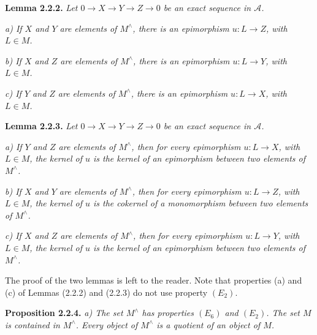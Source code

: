 \clearpage
{}%
\begingroup\small\setlength{\parskip}{0pt}\setlength{\emergencystretch}{1.5em}
\setlength{\abovedisplayskip}{4pt plus 2pt minus 2pt}%
\setlength{\belowdisplayskip}{4pt plus 2pt minus 2pt}%

\noindent\textbf{Lemma 2.2.2.}\quad
\textit{Let
$0\longrightarrow X\longrightarrow Y\longrightarrow Z\longrightarrow0$
be an exact sequence in $\mathcal A$.}

\noindent\textit{a) If $X$ and $Y$ are elements of $M^{\wedge}$, there is
an epimorphism $u\colon L\longrightarrow Z$, with $L\in M$.}

\noindent\textit{b) If $X$ and $Z$ are elements of $M^{\wedge}$, there is
an epimorphism $u\colon L\longrightarrow Y$, with $L\in M$.}

\noindent\textit{c) If $Y$ and $Z$ are elements of $M^{\wedge}$, there is
an epimorphism $u\colon L\longrightarrow X$, with $L\in M$.}

\medskip\noindent\textbf{Lemma 2.2.3.}\quad
\textit{Let
$0\longrightarrow X\longrightarrow Y\longrightarrow Z\longrightarrow0$
be an exact sequence in $\mathcal A$.}

\noindent\textit{a) If $Y$ and $Z$ are elements of $M^{\wedge}$, then for
every epimorphism $u\colon L\longrightarrow X$, with $L\in M$, the kernel
of $u$ is the kernel of an epimorphism between two elements of
$M^{\wedge}$.}

\noindent\textit{b) If $X$ and $Y$ are elements of $M^{\wedge}$, then for
every epimorphism $u\colon L\longrightarrow Z$, with $L\in M$, the kernel
of $u$ is the cokernel of a monomorphism between two elements of
$M^{\wedge}$.}

\noindent\textit{c) If $X$ and $Z$ are elements of $M^{\wedge}$, then for
every epimorphism $u\colon L\longrightarrow Y$, with $L\in M$, the kernel
of $u$ is the kernel of an epimorphism between two elements of
$M^{\wedge}$.}

The proof of the two lemmas is left to the reader. Note that properties
(a) and (c) of Lemmas (2.2.2) and (2.2.3) do not use property $(E_2)$.

\medskip\noindent\textbf{Proposition 2.2.4.}\quad
\textit{a) The set $M^{\wedge}$ has properties $(E_6)$ and $(E_2)$. The
set $M$ is contained in $M^{\wedge}$. Every object of $M^{\wedge}$ is a
quotient of an object of $M$.}

